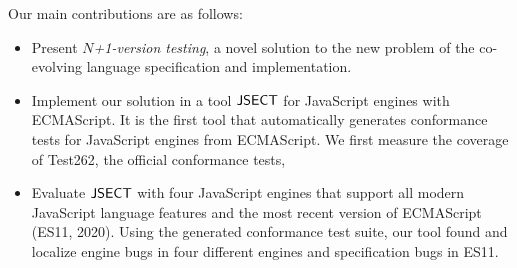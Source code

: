 Our main contributions are as follows:
\begin{itemize}
  \item Present \textit{$N$+1-version testing}, a novel solution to the new
    problem of the co-evolving language specification and implementation.
  \item Implement our solution in a tool $\text{\sf JSECT}$ for JavaScript engines with
    ECMAScript.  It is the first tool that automatically generates conformance
    tests for JavaScript engines from ECMAScript.  We first measure the coverage
    of Test262, the official conformance tests, 
  \item Evaluate $\text{\sf JSECT}$ with four JavaScript engines that support all modern
    JavaScript language features and the most recent version of ECMAScript
    (ES11, 2020).  Using the generated conformance test suite, our tool found
    and localize  engine bugs in four different engines and 
    specification bugs in ES11.
\end{itemize}

